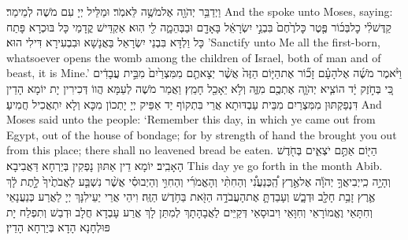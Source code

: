 \newperek
{}
{וַיְדַבֵּ֥ר יְהֹוָ֖ה אֶל\maqqaf מֹשֶׁ֥ה לֵּאמֹֽר׃}
{וּמַלֵּיל יְיָ עִם מֹשֶׁה לְמֵימַר׃}
{And the \lord\space spoke unto Moses, saying:}{}
{קַדֶּשׁ\maqqaf לִ֨י כׇל\maqqaf בְּכ֜וֹר פֶּ֤טֶר כׇּל\maqqaf רֶ֙חֶם֙ בִּבְנֵ֣י יִשְׂרָאֵ֔ל בָּאָדָ֖ם וּבַבְּהֵמָ֑ה לִ֖י הֽוּא׃}
{אַקְדֵּישׁ קֳדָמַי כָּל בּוּכְרָא פָּתַח כָּל וַלְדָּא בִּבְנֵי יִשְׂרָאֵל בַּאֲנָשָׁא וּבִבְעִירָא דִּילִי הוּא׃}
{’Sanctify unto Me all the first-born, whatsoever opens the womb among the children of Israel, both of man and of beast, it is Mine.’}{}
{וַיֹּ֨אמֶר מֹשֶׁ֜ה אֶל\maqqaf הָעָ֗ם זָכ֞וֹר אֶת\maqqaf הַיּ֤וֹם הַזֶּה֙ אֲשֶׁ֨ר יְצָאתֶ֤ם מִמִּצְרַ֙יִם֙ מִבֵּ֣ית עֲבָדִ֔ים כִּ֚י בְּחֹ֣זֶק יָ֔ד הוֹצִ֧יא יְהֹוָ֛ה אֶתְכֶ֖ם מִזֶּ֑ה וְלֹ֥א יֵאָכֵ֖ל חָמֵֽץ׃}
{וַאֲמַר מֹשֶׁה לְעַמָּא הֲווֹ דְּכִירִין יָת יוֹמָא הָדֵין דִּנְפַקְתּוּן מִמִּצְרַיִם מִבֵּית עַבְדּוּתָא אֲרֵי בִּתְקוֹף יַד אַפֵּיק יְיָ יָתְכוֹן מִכָּא וְלָא יִתְאֲכִיל חֲמִיעַ׃}
{And Moses said unto the people: ‘Remember this day, in which ye came out from Egypt, out of the house of bondage; for by strength of hand the \lord\space brought you out from this place; there shall no leavened bread be eaten.}{}
{הַיּ֖וֹם אַתֶּ֣ם יֹצְאִ֑ים בְּחֹ֖דֶשׁ הָאָבִֽיב׃}
{יוֹמָא דֵין אַתּוּן נָפְקִין בְּיַרְחָא דַּאֲבִיבָא׃}
{This day ye go forth in the month Abib.}{}
{וְהָיָ֣ה כִֽי\maqqaf יְבִיאֲךָ֣ יְהֹוָ֡ה אֶל\maqqaf אֶ֣רֶץ הַֽ֠כְּנַעֲנִ֠י וְהַחִתִּ֨י וְהָאֱמֹרִ֜י וְהַחִוִּ֣י וְהַיְבוּסִ֗י אֲשֶׁ֨ר נִשְׁבַּ֤ע לַאֲבֹתֶ֙יךָ֙ לָ֣תֶת לָ֔ךְ אֶ֛רֶץ זָבַ֥ת חָלָ֖ב וּדְבָ֑שׁ וְעָבַדְתָּ֛ אֶת\maqqaf הָעֲבֹדָ֥ה הַזֹּ֖את בַּחֹ֥דֶשׁ הַזֶּֽה׃}
{וִיהֵי אֲרֵי יַעֵילִנָּךְ יְיָ לַאֲרַע כְּנַעֲנָאֵי וְחִתָּאֵי וֶאֱמוֹרָאֵי וְחִוָּאֵי וִיבוּסָאֵי דְּקַיֵּים לַאֲבָהָתָךְ לְמִתַּן לָךְ אֲרַע עָבְדָא חֲלָב וּדְבַשׁ וְתִפְלַח יָת פּוּלְחָנָא הָדָא בְּיַרְחָא הָדֵין׃}
